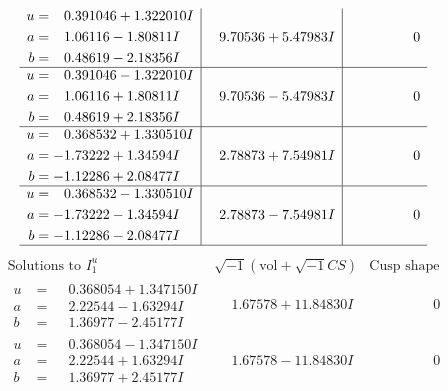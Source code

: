 \documentclass[1p]{elsarticle_modified}
\theoremstyle{definition}
\newcommand{\I}{\sqrt{-1}}
\begin{document}
$$\begin{array}{c|c|c}
\begin{aligned}
u &= \phantom{-}0.391046 + 1.322010 I \\
a &= \phantom{-}1.06116 - 1.80811 I \\
b &= \phantom{-}0.48619 - 2.18356 I\end{aligned}
 & \phantom{-}9.70536 + 5.47983 I & \phantom{-0.000000 } 0 \\ \hline\begin{aligned}
u &= \phantom{-}0.391046 - 1.322010 I \\
a &= \phantom{-}1.06116 + 1.80811 I \\
b &= \phantom{-}0.48619 + 2.18356 I\end{aligned}
 & \phantom{-}9.70536 - 5.47983 I & \phantom{-0.000000 } 0 \\ \hline\begin{aligned}
u &= \phantom{-}0.368532 + 1.330510 I \\
a &= -1.73222 + 1.34594 I \\
b &= -1.12286 + 2.08477 I\end{aligned}
 & \phantom{-}2.78873 + 7.54981 I & \phantom{-0.000000 } 0 \\ \hline\begin{aligned}
u &= \phantom{-}0.368532 - 1.330510 I \\
a &= -1.73222 - 1.34594 I \\
b &= -1.12286 - 2.08477 I\end{aligned}
 & \phantom{-}2.78873 - 7.54981 I & \phantom{-0.000000 } 0\\
 \hline 
 \end{array}$$\newpage$$\begin{array}{c|c|c}  
\text{Solutions to }I^u_{1}& \I (\text{vol} + \sqrt{-1}CS) & \text{Cusp shape}\\
 \hline 
\begin{aligned}
u &= \phantom{-}0.368054 + 1.347150 I \\
a &= \phantom{-}2.22544 - 1.63294 I \\
b &= \phantom{-}1.36977 - 2.45177 I\end{aligned}
 & \phantom{-}1.67578 + 11.84830 I & \phantom{-0.000000 } 0 \\ \hline\begin{aligned}
u &= \phantom{-}0.368054 - 1.347150 I \\
a &= \phantom{-}2.22544 + 1.63294 I \\
b &= \phantom{-}1.36977 + 2.45177 I\end{aligned}
 & \phantom{-}1.67578 - 11.84830 I & \phantom{-0.000000 } 0 \\ \hline\begin{aligned}

\end{aligned}
\end{array}$$
\end{document}
